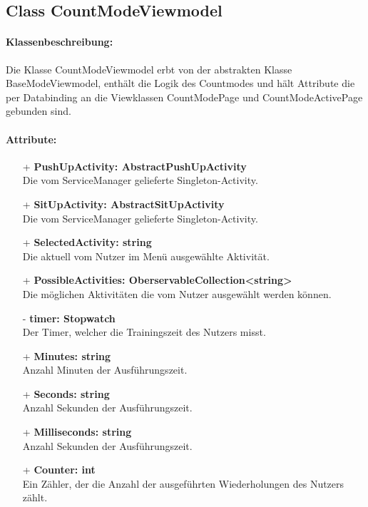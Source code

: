 \documentclass[a4paper,12pt]{article}
\begin{document}
\subsection{Class CountModeViewmodel}
\paragraph{Klassenbeschreibung:}
Die Klasse CountModeViewmodel erbt von der abstrakten Klasse BaseModeViewmodel, enthält die Logik des Countmodes und hält Attribute die per Databinding an die Viewklassen CountModePage und CountModeActivePage gebunden sind.
\paragraph{Attribute:}
\begin{itemize}
	\item[+] \textbf{PushUpActivity: AbstractPushUpActivity} \\ Die vom ServiceManager gelieferte Singleton-Activity.
	\item[+] \textbf{SitUpActivity: AbstractSitUpActivity} \\ Die vom ServiceManager gelieferte Singleton-Activity.
	\item[+] \textbf{SelectedActivity: string} \\ Die aktuell vom Nutzer im Menü ausgewählte Aktivität. 
	\item[+] \textbf{PossibleActivities: OberservableCollection<string>} \\ Die möglichen Aktivitäten die vom Nutzer ausgewählt werden können. 
	\item[-] \textbf{timer: Stopwatch} \\ Der Timer, welcher die Trainingszeit des Nutzers misst. 
	\item[+] \textbf{Minutes: string} \\ Anzahl Minuten der Ausführungszeit. 
	\item[+] \textbf{Seconds: string} \\ Anzahl Sekunden der Ausführungszeit. 
	\item[+] \textbf{Milliseconds: string} \\ Anzahl Sekunden der Ausführungszeit. 
	\item[+] \textbf{Counter: int} \\ Ein Zähler, der die Anzahl der ausgeführten Wiederholungen des Nutzers zählt. 
\end{itemize}
\end{document}
